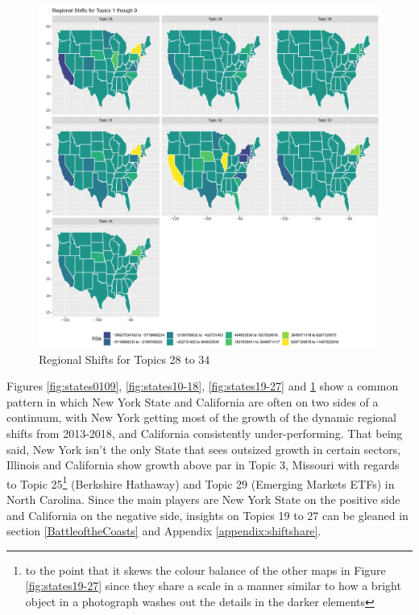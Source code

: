 \begin{figure}
	\centering
	\includegraphics[width=1\linewidth]{Figures/ChapterV/States_28_34}
	\caption[Regional Shifts for Topics 19 to 27]{Regional Shifts for Topics 28 to 34}
	\label{fig:states28-34}
\end{figure}
	

Figures \ref{fig:states0109}, \ref{fig:states10-18}, \ref{fig:states19-27} and \ref{fig:states28-34} show a common pattern in which New York State and California are often on two sides of a continuum, with New York getting most of the growth of the dynamic regional shifts from 2013-2018, and California consistently under-performing.  That being said, New York isn't the only State that sees outsized growth in certain sectors, Illinois and California show growth above par in Topic 3,  Missouri with regards to Topic 25\footnote{to the point that it skews the colour balance of the other maps in Figure \ref{fig:states19-27} since they share a scale in a manner similar to how a bright object in a photograph washes out the details in the darker elements} (Berkshire Hathaway) and Topic 29 (Emerging Markets ETFs) in North Carolina.  Since the main players are New York State on the positive side and California on the negative side, insights on Topics 19 to 27 can be gleaned in section \ref{BattleoftheCoasts} and Appendix \ref{appendix:shiftshare}. 

